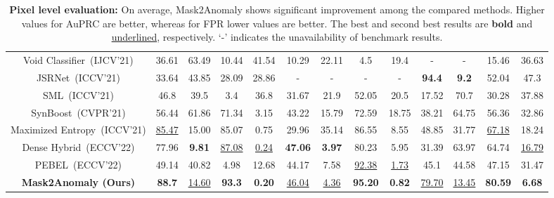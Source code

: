 \documentclass[10pt,twocolumn,letterpaper]{article}
\begin{document}
\begin{table*}[!ht]
{\begin{tabular}{c|cc|cc|cc|cc|cc|cc}
Void Classifier~\cite{blum2021fishyscapes}(IJCV'21)&36.61	&63.49	&10.44	&41.54	&10.29	&22.11	&4.5	&19.4	&-	&-	&15.46	&36.63\\


JSRNet~\cite{vojir2021road}(ICCV'21)&33.64	&43.85&	28.09	&28.86	&-	&-	&-	&-	&\textbf{94.4}	&\textbf{9.2}	&52.04	&47.3\\
SML~\cite{jung2021standardized}(ICCV'21) &46.8	&39.5	&3.4	&36.8	&31.67	&21.9	&52.05	&20.5	&17.52	&70.7	&30.28	&37.88\\
SynBoost~\cite{di2021pixel}(CVPR'21) &56.44	&61.86	&71.34	&3.15	&43.22	&15.79	&72.59	&18.75	&38.21	&64.75	&56.36	&32.86\\
Maximized Entropy~\cite{chan2021entropy}(ICCV'21) &\underline{85.47}	&15.00	&85.07	&0.75	&29.96	&35.14	&86.55	&8.55	&48.85	&31.77	&\underline{67.18}	&18.24\\
Dense Hybrid~\cite{grcic2022densehybrid}(ECCV'22)&77.96&	\textbf{9.81}	&\underline{87.08}	&\underline{0.24}	&\textbf{47.06}	&\textbf{3.97}&	80.23	&5.95	&31.39	&63.97	&64.74	&\underline{16.79}\\
PEBEL~\cite{tian2022pixel}(ECCV'22)&49.14	&40.82	&4.98	&12.68	&44.17	&7.58	&\underline{92.38}	&\underline{1.73}	&45.1	&44.58	&47.15	&31.47\\
\hline
\textbf{Mask2Anomaly (Ours)}& \textbf{88.7}	&\underline{14.60}	&\textbf{93.3}	&\textbf{0.20}	&\underline{46.04}	&\underline{4.36}	&\textbf{95.20}	&\textbf{0.82}	&\underline{79.70}	&\underline{13.45}	&\textbf{80.59}	&\textbf{6.68}\\
\end{tabular}}
\caption{\textbf{Pixel level evaluation:} On average, Mask2Anomaly shows significant improvement  among the compared methods. Higher values for AuPRC are better, whereas for FPR lower values are better. The best and second best results are \textbf{bold} and \underline{underlined}, respectively. `-' indicates the unavailability of benchmark results. } \vspace{-1em}
\label{tab:main} 
\end{table*}
\end{document}

